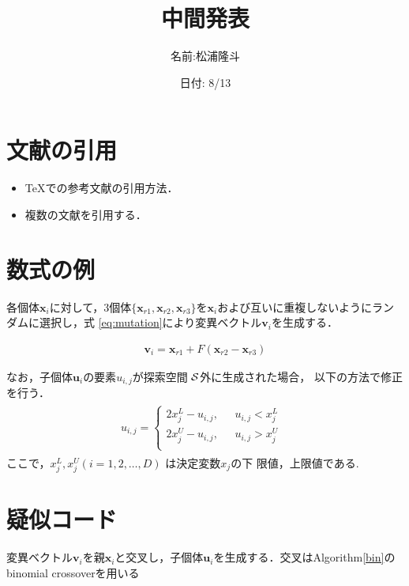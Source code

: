 \documentclass[twocolumn,10pt]{jarticle}
\title{中間発表}
\author{名前:松浦隆斗}
\date{日付: 8/13}
\begin{document}
\maketitle


\section{文献の引用}

\begin{itemize}
      \item TeXでの参考文献の引用方法\cite{DE}．
      \item 複数の文献を引用する\cite{EA1,EA2}．
\end{itemize}



\section{数式の例}
各個体$\bm{x}_i$に対して，3個体$ \{  \bm{x}_{r1},\bm{x}_{r2},\bm{x}_{r3}  \} $を$\bm{x}_i$および互いに重複しないようにランダムに選択し，式
\eqref{eq:mutation}により変異ベクトル$\bm{v}_i$を生成する．

 \begin{eqnarray}
 \bm{v}_i= \bm{x}_{r1}+ F (\bm{x}_{r2}-\bm{x}_{r3})
\label{eq:mutation}
\end{eqnarray}

なお，子個体$\bm{u}_i$の要素$u_{i,j}$が探索空間 $\cal{S}$外に生成された場合，
以下の方法で修正を行う．
 \begin{eqnarray}
\begin{split}
u_{i,j} =
\left\{
\begin{array}{ll}
 2x^{L}_j-u_{i,j},  & \mbox{ $u_{i,j} <x^{L}_j $   } \\
  2x^{U}_j-u_{i,j},		   & \mbox{ $u_{i,j} >x^{U}_j $ } \\
\end{array}
\right.
\end{split}
\end{eqnarray}
ここで，$x^{L}_j, x^{U}_j (i = 1, 2, \dots ,D)$ は決定変数$x_j$の下
限値，上限値である.





\section{疑似コード}
変異ベクトル$\bm{v}_i$を親$\bm{x}_i$と交叉し，子個体$\bm{u}_{i}$を生成する．交叉はAlgorithm\ref{bin}のbinomial crossoverを用いる
\end{document}

